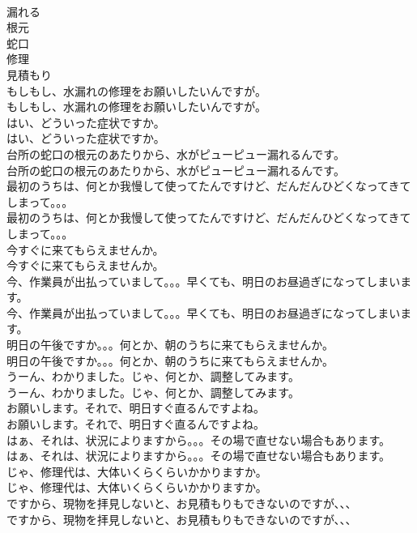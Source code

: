 \documentclass[8pt]{extreport}
\begin{document}
\begin{CJK}{UTF8}{min}
\\	漏れる
\\	根元
\\	蛇口
\\	修理
\\	見積もり
\\	もしもし、水漏れの修理をお願いしたいんですが。	
\\	もしもし、水漏れの修理をお願いしたいんですが。 
\\	はい、どういった症状ですか。	
\\	はい、どういった症状ですか。 
\\	台所の蛇口の根元のあたりから、水がピューピュー漏れるんです。	
\\	台所の蛇口の根元のあたりから、水がピューピュー漏れるんです。　 
\\	最初のうちは、何とか我慢して使ってたんですけど、だんだんひどくなってきてしまって。。。	
\\	最初のうちは、何とか我慢して使ってたんですけど、だんだんひどくなってきてしまって。。。 
\\	今すぐに来てもらえませんか。	
\\	今すぐに来てもらえませんか。 
\\	今、作業員が出払っていまして。。。早くても、明日のお昼過ぎになってしまいます。	
\\	今、作業員が出払っていまして。。。早くても、明日のお昼過ぎになってしまいます。 
\\	明日の午後ですか。。。何とか、朝のうちに来てもらえませんか。	
\\	明日の午後ですか。。。何とか、朝のうちに来てもらえませんか。 
\\	うーん、わかりました。じゃ、何とか、調整してみます。	
\\	うーん、わかりました。じゃ、何とか、調整してみます。 
\\	お願いします。それで、明日すぐ直るんですよね。	
\\	お願いします。それで、明日すぐ直るんですよね。 
\\	はぁ、それは、状況によりますから。。。その場で直せない場合もあります。	
\\	はぁ、それは、状況によりますから。。。その場で直せない場合もあります。 
\\	じゃ、修理代は、大体いくらくらいかかりますか。	
\\	じゃ、修理代は、大体いくらくらいかかりますか。 
\\	ですから、現物を拝見しないと、お見積もりもできないのですが、、、	
\\	ですから、現物を拝見しないと、お見積もりもできないのですが、、、 

\end{CJK}
\end{document}

